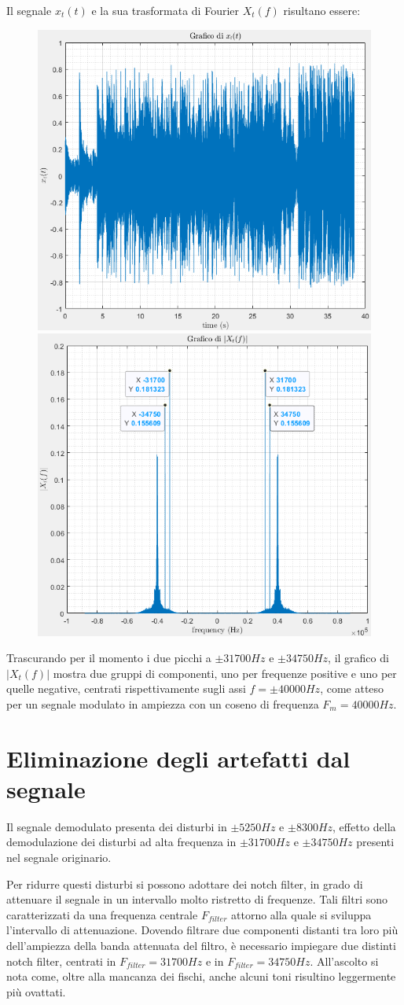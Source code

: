 \documentclass[12pt]{article}
\begin{document}
Il segnale $x_{t}(t)$ e la sua trasformata di Fourier $X_{t}(f)$ risultano essere:
\begin{figure}[H]
	\centering
	\includegraphics[width=0.45\linewidth]{./images/x_t.png}
	\includegraphics[width=0.45\linewidth]{./images/fft_x_t.png}
\end{figure}

Trascurando per il momento i due picchi a $\pm31700Hz$ e $\pm34750Hz$, il grafico di $|X_{t}(f)|$ mostra due gruppi di componenti, uno per frequenze positive e uno per quelle negative, centrati rispettivamente sugli assi $f = \pm40000Hz$, come atteso per un segnale modulato in ampiezza con un coseno di frequenza $F_{m} = 40000Hz$.

\section{Eliminazione degli artefatti dal segnale}

Il segnale demodulato presenta dei disturbi in $\pm5250Hz$ e $\pm8300Hz$, effetto della demodulazione dei disturbi ad alta frequenza in $\pm31700Hz$ e $\pm34750Hz$ presenti nel segnale originario.

Per ridurre questi disturbi si possono adottare dei notch filter, in grado di attenuare il segnale in un intervallo molto ristretto di frequenze. Tali filtri sono caratterizzati da una frequenza centrale $F_{filter}$ attorno alla quale si sviluppa l'intervallo di attenuazione. Dovendo filtrare due componenti distanti tra loro più dell'ampiezza della banda attenuata del filtro, è necessario impiegare due distinti notch filter, centrati in $F_{filter} = 31700Hz$ e in $F_{filter} = 34750Hz$. All'ascolto si nota come, oltre alla mancanza dei fischi, anche alcuni toni risultino leggermente più ovattati.
\end{document}

